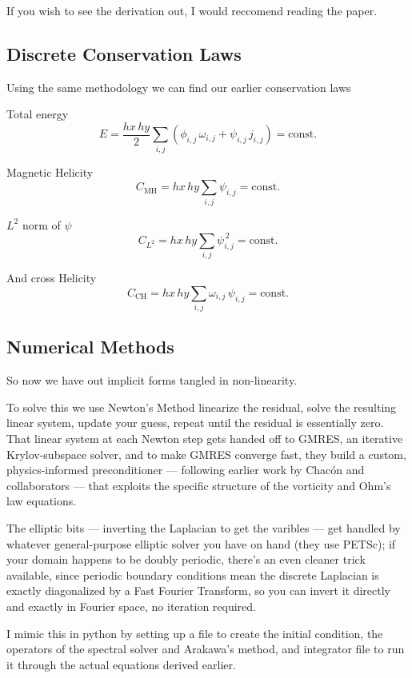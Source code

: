 If you wish to see the derivation out, I would reccomend reading the paper.

\subsection{Discrete Conservation Laws}


Using the same methodology we can find our earlier conservation laws

Total energy
\[
E
= \frac{hx\,hy}{2}
  \sum_{i,j} \left( \phi_{i,j}\,\omega_{i,j} + \psi_{i,j}\,j_{i,j} \right)
= \text{const.}
  \]

  Magnetic Helicity
\[
C_{\mathrm{MH}}
= hx\,hy \sum_{i,j} \psi_{i,j}
= \text{const.}
  \]

  $L^2$ norm of $\psi$
\[
C_{L^2}
= hx\,hy \sum_{i,j} \psi_{i,j}^{\,2}
= \text{const.}
  \]

  And cross Helicity
\[
  C_{\mathrm{CH}}
= hx\,hy \sum_{i,j} \omega_{i,j}\,\psi_{i,j}
= \text{const.}
\]

\subsection{Numerical Methods}

So now we have out implicit forms tangled in non-linearity.

To solve this we use Newton's Method linearize the residual, solve the resulting linear system, update your guess, repeat until the residual is essentially zero. That linear system at each Newton step gets handed off to GMRES, an iterative Krylov-subspace solver, and to make GMRES converge fast, they build a custom, physics-informed preconditioner — following earlier work by Chacón and collaborators — that exploits the specific structure of the vorticity and Ohm's law equations.

The elliptic bits — inverting the Laplacian to get the varibles — get handled by whatever general-purpose elliptic solver you have on hand (they use PETSc); if your domain happens to be doubly periodic, there's an even cleaner trick available, since periodic boundary conditions mean the discrete Laplacian is exactly diagonalized by a Fast Fourier Transform, so you can invert it directly and exactly in Fourier space, no iteration required.


I mimic this in python by setting up a file to create the initial condition, the operators of the spectral solver and Arakawa's method, and integrator file to run it through the actual equations derived earlier.

